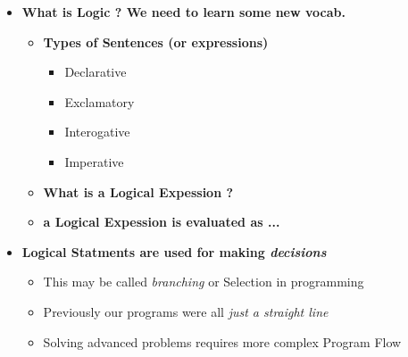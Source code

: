 \documentclass[11pt]{article}
\begin{document}
\Large
\begin{itemize}


	
	\item \textbf{ \LARGE What is \color{mypurple}Logic \color{black}? We need to learn some new vocab.}\\
	
		
		\begin{itemize}
			
			\item \textbf{\Large Types of Sentences (or expressions)}  
				\begin{itemize}
					\item Declarative \\
					\item Exclamatory\\
					\item Interogative\\
					\item Imperative\\
				\end{itemize}
			\item \textbf{ \Large What is a  \color{mypurple}Logical Expession \color{black}?} \\  \vspace{30mm}
            			
            		\item \textbf{ \Large a  \color{mypurple} Logical Expession \color{black}  is evaluated as ...} 
		\end{itemize}
\newpage

	\item \textbf{ \LARGE \color{mypurple}Logical Statments \color{black} are used for making {\it decisions}}\\
		\begin{itemize}
					\item This may be called {\it branching} or \color{blue} Selection \color{black} in programming \\
					\item Previously our programs were all {\it just a straight line}\\
					\item Solving advanced problems requires more complex \color{mybrown} Program Flow\color{black} \\

				\end{itemize}
				\newpage
				

\end{itemize}
\end{document}
